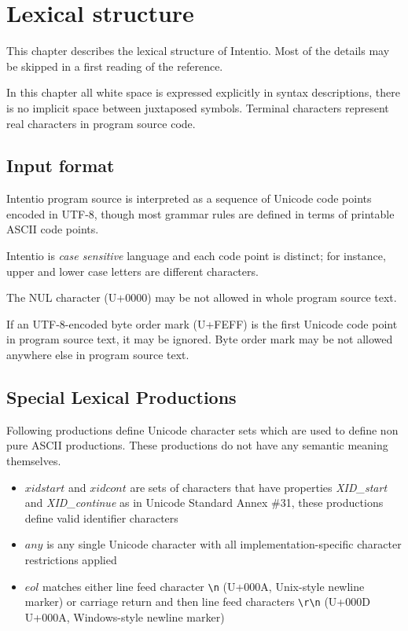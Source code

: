 \chapter{Lexical structure}

This chapter describes the lexical structure of Intentio. Most of the details may be skipped in a first reading of the reference.

In this chapter all white space is expressed explicitly in syntax descriptions, there is no implicit space between juxtaposed symbols. Terminal characters represent real characters in program source code.

\section{Input format}

Intentio program source is interpreted as a sequence of Unicode code points encoded in UTF-8, though most grammar rules are defined in terms of printable ASCII code points.

Intentio is \emph{case sensitive} language and each code point is distinct; for instance, upper and lower case letters are different characters.

The NUL character (U+0000) may be not allowed in whole program source text.

If an UTF-8-encoded byte order mark (U+FEFF) is the first Unicode code point in program source text, it may be ignored. Byte order mark may be not allowed anywhere else in program source text.

\section{Special Lexical Productions}

Following productions define Unicode character sets which are used to define non pure ASCII productions. These productions do not have any semantic meaning themselves.

\begin{bnfutils}
\begin{itemize}
  \item \(xidstart\) and \(xidcont\) are sets of characters that have properties \emph{XID\_start} and \emph{XID\_continue} as in Unicode Standard Annex \#31\cite{UAX31}, these productions define valid identifier characters
  \item \(any\) is any single Unicode character with all implementation-specific character restrictions applied
  \item \(eol\) matches either line feed character \texttt{\textbackslash n} (U+000A, Unix-style newline marker) or carriage return and then line feed characters \texttt{\textbackslash r\textbackslash n} (U+000D U+000A, Windows-style newline marker)
\end{itemize}
\end{bnfutils}

